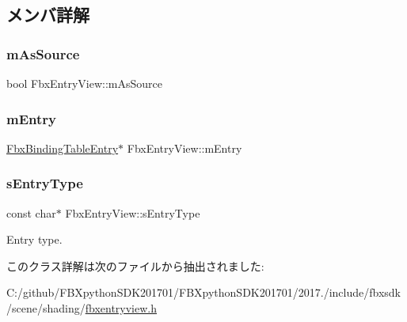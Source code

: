 \subsection{メンバ詳解}
\mbox{\label{class_fbx_entry_view_a274da88dfb87f2725f9c8fdbfe860c75}} 
\subsubsection{\texorpdfstring{m\+As\+Source}{mAsSource}}
{\footnotesize\ttfamily bool Fbx\+Entry\+View\+::m\+As\+Source\hspace{0.3cm}{\ttfamily [protected]}}

\mbox{\label{class_fbx_entry_view_a74afe18ad35e48e7bd6dce480ab49ad7}} 
\subsubsection{\texorpdfstring{m\+Entry}{mEntry}}
{\footnotesize\ttfamily \hyperlink{class_fbx_binding_table_entry}{Fbx\+Binding\+Table\+Entry}$\ast$ Fbx\+Entry\+View\+::m\+Entry\hspace{0.3cm}{\ttfamily [protected]}}

\mbox{\label{class_fbx_entry_view_a483b58dc47c39143426afe0d2076b6f6}} 
\subsubsection{\texorpdfstring{s\+Entry\+Type}{sEntryType}}
{\footnotesize\ttfamily const char$\ast$ Fbx\+Entry\+View\+::s\+Entry\+Type\hspace{0.3cm}{\ttfamily [static]}}



Entry type. 



このクラス詳解は次のファイルから抽出されました\+:\begin{DoxyCompactItemize}
\item 
C\+:/github/\+F\+B\+Xpython\+S\+D\+K201701/\+F\+B\+Xpython\+S\+D\+K201701/2017./include/fbxsdk/scene/shading/\hyperlink{fbxentryview_8h}{fbxentryview.\+h}\end{DoxyCompactItemize}
